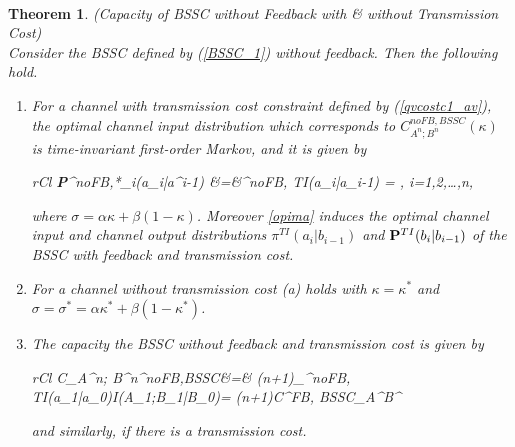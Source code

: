 \documentclass[11pt, a4paper, journal,onecolumn]{IEEEtran}
\let\bbordermatrix\bordermatrix
\newcommand{\rar}{\rightarrow}
\newcommand{\beae}{\begin{IEEEeqnarray}{rCl}}
\newcommand{\eeae}{\end{IEEEeqnarray}}
\newcommand{\nms}{\IEEEeqnarraynumspace}
\newcommand{\hso}{\hspace{.1in}}
\newtheorem{theorem}{Theorem}[section]
\begin{document}
\ \
\begin{theorem}(Capacity of BSSC  without  Feedback with \& without Transmission Cost)\label{ch4spnf} \\
Consider the BSSC defined by (\ref{BSSC_1}) without feedback. Then the following hold.
\begin{enumerate}
\item[(a)]  For a channel with transmission cost constraint defined by (\ref{qvcostc1_av}), the optimal channel input distribution which corresponds to $C_{A^n; B^n}^{noFB,BSSC}(\kappa)$ is time-invariant first-order Markov, and it is given by
\beae
{\bf P}^{noFB,*}_i(a_i|a^{i-1}) &=&\pi^{noFB, TI}(a_{i}|a_{i{-}1}) = \bbordermatrix{~ &  &  \cr
                   & \dfrac{1-\kappa-\sigma}{1-2\sigma} & \dfrac{\kappa-\sigma}{1-2\sigma}   \cr
                   & \dfrac{\kappa-\sigma}{1-2\sigma}   & \dfrac{1-\kappa-\sigma}{1-2\sigma} \cr}, \hso i=1,2,\ldots,n, \nms
                  \label{opima} \\ \nonumber
\eeae
where $\sigma={\alpha}{\kappa}+{\beta}({1-\kappa})$. Moreover \eqref{opima} 
induces the optimal channel input and channel output distributions ${\pi}^{TI}(a_i|b_{i-1})$ and ${{\bf P}^{TI}(b_{i}|b_{i-1})}$  of the BSSC  with feedback and transmission cost.\\
\item[(b)]  For a channel  without transmission cost (a)  holds with  $\kappa=\kappa^*$ and $\sigma=\sigma^*={\alpha}{\kappa^*}+{\beta}({1-\kappa^*})$.\\
\item[(c)]  The capacity the BSSC without feedback and transmission cost is given by
\beae
C_{A^n; B^n}^{noFB,BSSC}&=& (n+1)\max_{\pi^{noFB, TI}(a_{1}|a_{0})}I(A_1;B_1|B_{0})\label{bssc_cap_nofb}= (n+1)C^{FB, BSSC}_{A^\infty \rar B^\infty} \label{bssc_cap_nofb_new}
\eeae
and similarly, if there is a transmission cost.
\end{enumerate}
\end{theorem}
\end{document}
